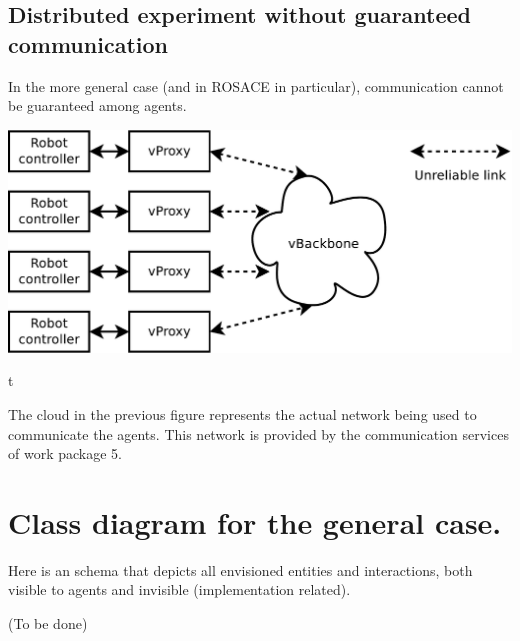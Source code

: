 \documentclass[a4paper,11pt]{article}
\begin{document}
\subsection{Distributed experiment without guaranteed communication}

In the more general case (and in ROSACE in particular), communication cannot be guaranteed among agents.

\begin{center}
\includegraphics[width=0.666\columnwidth]{figures/distrib}
\end{center}t

The cloud in the previous figure represents the actual network being used to communicate the agents. This network is provided by the communication services of work package 5.

\section{Class diagram for the general case.}

Here is an schema that depicts all envisioned entities and interactions, both visible to agents and invisible (implementation related).

(To be done)
\end{document}
